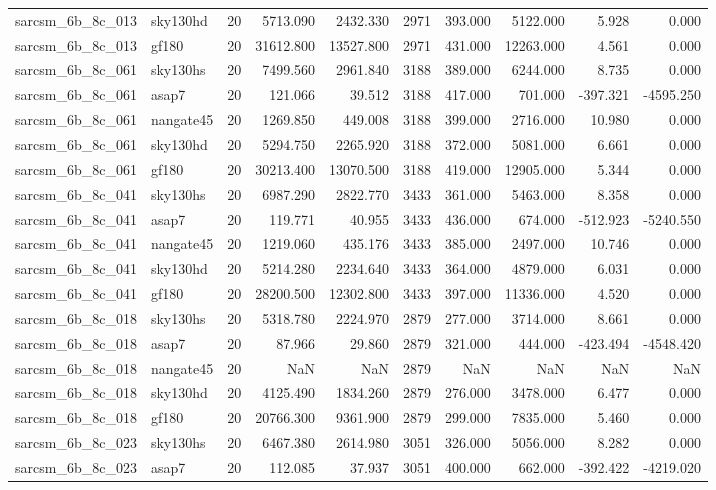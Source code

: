 \begin{longtable}{llrrrrrrrr}
sarcsm\_6b\_8c\_013 & sky130hd & 20 & 5713.090 & 2432.330 & 2971 & 393.000 & 5122.000 & 5.928 & 0.000 \\
sarcsm\_6b\_8c\_013 & gf180 & 20 & 31612.800 & 13527.800 & 2971 & 431.000 & 12263.000 & 4.561 & 0.000 \\
sarcsm\_6b\_8c\_061 & sky130hs & 20 & 7499.560 & 2961.840 & 3188 & 389.000 & 6244.000 & 8.735 & 0.000 \\
sarcsm\_6b\_8c\_061 & asap7 & 20 & 121.066 & 39.512 & 3188 & 417.000 & 701.000 & -397.321 & -4595.250 \\
sarcsm\_6b\_8c\_061 & nangate45 & 20 & 1269.850 & 449.008 & 3188 & 399.000 & 2716.000 & 10.980 & 0.000 \\
sarcsm\_6b\_8c\_061 & sky130hd & 20 & 5294.750 & 2265.920 & 3188 & 372.000 & 5081.000 & 6.661 & 0.000 \\
sarcsm\_6b\_8c\_061 & gf180 & 20 & 30213.400 & 13070.500 & 3188 & 419.000 & 12905.000 & 5.344 & 0.000 \\
sarcsm\_6b\_8c\_041 & sky130hs & 20 & 6987.290 & 2822.770 & 3433 & 361.000 & 5463.000 & 8.358 & 0.000 \\
sarcsm\_6b\_8c\_041 & asap7 & 20 & 119.771 & 40.955 & 3433 & 436.000 & 674.000 & -512.923 & -5240.550 \\
sarcsm\_6b\_8c\_041 & nangate45 & 20 & 1219.060 & 435.176 & 3433 & 385.000 & 2497.000 & 10.746 & 0.000 \\
sarcsm\_6b\_8c\_041 & sky130hd & 20 & 5214.280 & 2234.640 & 3433 & 364.000 & 4879.000 & 6.031 & 0.000 \\
sarcsm\_6b\_8c\_041 & gf180 & 20 & 28200.500 & 12302.800 & 3433 & 397.000 & 11336.000 & 4.520 & 0.000 \\
sarcsm\_6b\_8c\_018 & sky130hs & 20 & 5318.780 & 2224.970 & 2879 & 277.000 & 3714.000 & 8.661 & 0.000 \\
sarcsm\_6b\_8c\_018 & asap7 & 20 & 87.966 & 29.860 & 2879 & 321.000 & 444.000 & -423.494 & -4548.420 \\
sarcsm\_6b\_8c\_018 & nangate45 & 20 & NaN & NaN & 2879 & NaN & NaN & NaN & NaN \\
sarcsm\_6b\_8c\_018 & sky130hd & 20 & 4125.490 & 1834.260 & 2879 & 276.000 & 3478.000 & 6.477 & 0.000 \\
sarcsm\_6b\_8c\_018 & gf180 & 20 & 20766.300 & 9361.900 & 2879 & 299.000 & 7835.000 & 5.460 & 0.000 \\
sarcsm\_6b\_8c\_023 & sky130hs & 20 & 6467.380 & 2614.980 & 3051 & 326.000 & 5056.000 & 8.282 & 0.000 \\
sarcsm\_6b\_8c\_023 & asap7 & 20 & 112.085 & 37.937 & 3051 & 400.000 & 662.000 & -392.422 & -4219.020 \\

\end{longtable}

